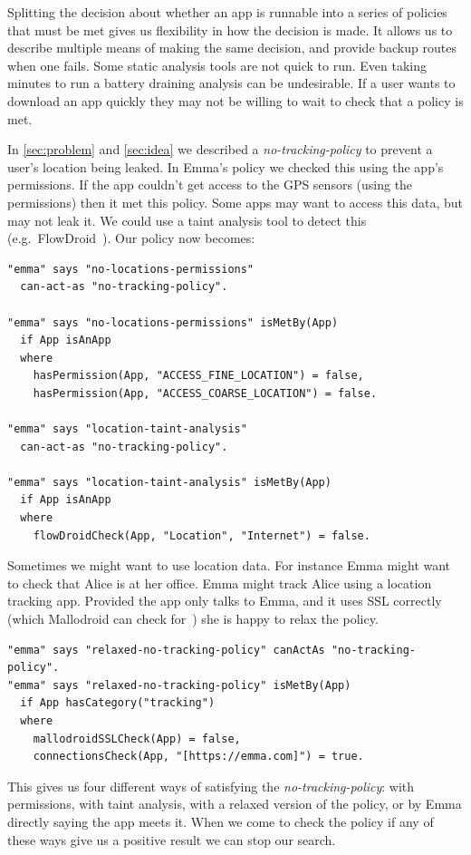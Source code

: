 \documentclass[]{llncs}
\begin{document}
Splitting the decision about whether an app is runnable into a series of policies that must be met gives us flexibility in how the decision is made.
It allows us to describe multiple means of making the same decision, and provide backup routes when one fails.
Some static analysis tools are not quick to run.
Even taking minutes to run a battery draining analysis can be undesirable.
If a user wants to download an app quickly they may not be willing to wait to check that a policy is met.

In \autoref{sec:problem} and \autoref{sec:idea} we described a \emph{no-tracking-policy} to prevent a user's location being leaked.
In Emma's policy we checked this using the app's permissions.
If the app couldn't get access to the GPS sensors (using the permissions) then it met this policy.
Some apps may want to access this data, but may not leak it.
We could use a taint analysis tool to detect this (e.g.~FlowDroid~\cite{Fritz:2013vi}).
Our policy now becomes:

\begin{lstlisting}
"emma" says "no-locations-permissions"
  can-act-as "no-tracking-policy".

"emma" says "no-locations-permissions" isMetBy(App)
  if App isAnApp
  where
    hasPermission(App, "ACCESS_FINE_LOCATION") = false,
    hasPermission(App, "ACCESS_COARSE_LOCATION") = false.

"emma" says "location-taint-analysis"
  can-act-as "no-tracking-policy".

"emma" says "location-taint-analysis" isMetBy(App)
  if App isAnApp
  where
    flowDroidCheck(App, "Location", "Internet") = false.
\end{lstlisting}

Sometimes we might want to use location data.
For instance Emma might want to check that Alice is at her office.
Emma might track Alice using a location tracking app.
Provided the app only talks to Emma, and it uses SSL correctly (which Mallodroid can check for~\cite{Fahl:2012dj}) she is happy to relax the policy.

\begin{lstlisting}
"emma" says "relaxed-no-tracking-policy" canActAs "no-tracking-policy".
"emma" says "relaxed-no-tracking-policy" isMetBy(App)
  if App hasCategory("tracking")
  where
    mallodroidSSLCheck(App) = false,
    connectionsCheck(App, "[https://emma.com]") = true.
\end{lstlisting}

This gives us four different ways of satisfying the \emph{no-tracking-policy}:
  with permissions,
  with taint analysis,
  with a relaxed version of the policy,
  or by Emma directly saying the app meets it.
When we come to check the policy if any of these ways give us a positive result we can stop our search.
\end{document}
